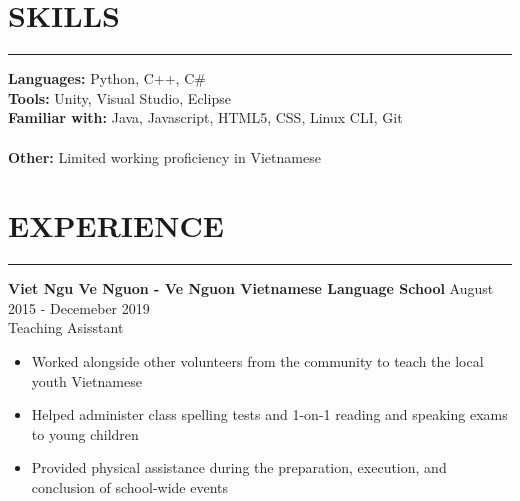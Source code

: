 \documentclass{article}
\begin{document}
\section*{SKILLS} \vspace{-6pt} \hrule \vspace{6pt}
\textbf{Languages:} Python, C++, C$\#$ \\
\textbf{Tools:} Unity, Visual Studio, Eclipse\\
\textbf{Familiar with:} Java, Javascript, HTML5, CSS, Linux CLI, Git \\\vspace{-6pt}\\
\textbf{Other:} Limited working proficiency in Vietnamese
\vspace{-10pt}

\section*{EXPERIENCE} \vspace{-6pt} \hrule \vspace{6pt}
\textbf{Viet Ngu Ve Nguon - Ve Nguon Vietnamese Language School} \hfill August 2015 - Decemeber 2019\\
Teaching Asisstant
\begin{itemize}
	\item\vspace{-6pt} Worked alongside other volunteers from the community to teach the local youth Vietnamese
	\item\vspace{-6pt} Helped administer class spelling tests and 1-on-1 reading and speaking exams to young children
	\item\vspace{-6pt} Provided physical assistance during the preparation, execution, and conclusion of school-wide events
\end{itemize}
\end{document}
